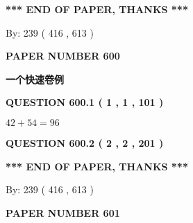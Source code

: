 \documentclass{ctexart}
\begin{document}
   
   
\vspace{1.0in} 
{\textbf{\large{ *** END OF PAPER, THANKS *** }}} 
   
   
\hspace{1.0in} By: 
 239 ( 416 ,  613 )
   
   
   
   
\newpage 
\setcounter{page}{ 
   600001 } 
   
   
   
   
 {\textbf{ \Large{ PAPER NUMBER  600  }}}
   
   
\vspace{0.2in}
   
   
   
   
   
   
 \vspace{0.2in}
{\LARGE {\textbf{ 一个快速卷例}}}
   
   
  
\vspace{0.2in}
  
{\textbf{\Large{QUESTION
600.1 
 ( 1 , 1 , 101 )
}}}
  
  
 
 

$ %
42 +  %
54=   %
96$
 
 
  
\vspace{0.2in}
  
{\textbf{\Large{QUESTION
600.2 
 ( 2 , 2 , 201 )
}}}
  
  
   
   
 \vspace{0.2in}
 
   
   
   
   
\vspace{1.0in} 
{\textbf{\large{ *** END OF PAPER, THANKS *** }}} 
   
   
\hspace{1.0in} By: 
 239 ( 416 ,  613 )
   
   
   
   
\newpage 
\setcounter{page}{ 
   601001 } 
   
   
   
   
 {\textbf{ \Large{ PAPER NUMBER  601  }}}
   
   
\vspace{0.2in}
   
\end{document}
